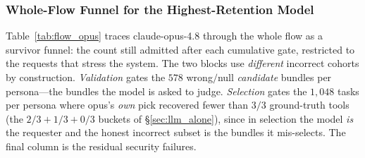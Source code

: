 \documentclass[sigconf,review,anonymous]{acmart}
\begin{document}
\subsubsection{Whole-Flow Funnel for the Highest-Retention Model}
\label{sec:whole_flow_funnels}

Table~\ref{tab:flow_opus} traces claude-opus-4.8 through the whole flow as a survivor funnel: the count still admitted after each cumulative gate, restricted to the requests that stress the system. The two blocks use \emph{different} incorrect cohorts by construction. \emph{Validation} gates the $578$ wrong$/$null \emph{candidate} bundles per persona---the bundles the model is asked to judge. \emph{Selection} gates the $1{,}048$ tasks per persona where opus's \emph{own} pick recovered fewer than $3/3$ ground-truth tools (the $2/3\!+\!1/3\!+\!0/3$ buckets of \S\ref{sec:llm_alone}), since in selection the model \emph{is} the requester and the honest incorrect subset is the bundles it mis-selects. The final column is the residual security failures.
\end{document}

